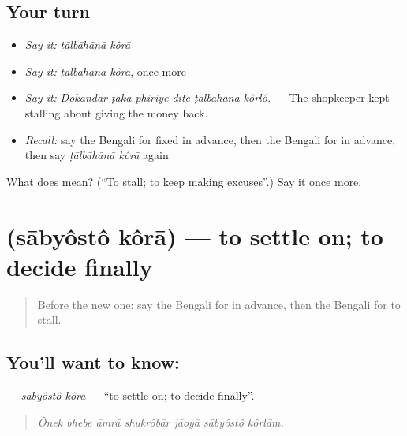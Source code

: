 \subsection*{Your turn}
\begin{itemize}
\raggedright
  \item \emph{Say it:} \emph{ṭālbāhānā kôrā}
  \item \emph{Say it:} \emph{ṭālbāhānā kôrā}, once more
  \item \emph{Say it:} \emph{Dokāndār ṭākā phiriye dite ṭālbāhānā kôrlô.} — The shopkeeper kept stalling about giving the money back.
  \item \emph{Recall:} say the Bengali for fixed in advance, then the Bengali for in advance, then say \emph{ṭālbāhānā kôrā} again
\end{itemize}

\begin{tcolorbox}[breakable,colback=teal!4,colframe=teal!35!black,title={Before you move on}]
What does   mean? (\textquotedblleft{}To stall; to keep making excuses\textquotedblright{}.) Say it once more.
\end{tcolorbox}
\section[\texorpdfstring{\bn{সাব্যস্ত} \bn{করা} (sābyôstô kôrā)}{সাব্যস্ত করা (sābyôstô kôrā)}]{  (sābyôstô kôrā) — to settle on; to decide finally}

\label{lesson:BN-C530-sabyosto-kora}



\begin{quote}
Before the new one: say the Bengali for in advance, then the Bengali for to stall.
\end{quote}

\subsection*{You'll want to know:  }
\textbf{ } — \emph{sābyôstô kôrā} — \textquotedblleft{}to settle on; to decide finally\textquotedblright{}.

\begin{quote}
      
\end{quote}

\begin{quote}
\emph{Ônek bhebe āmrā shukrôbār jāoyā sābyôstô kôrlām.}
\end{quote}

